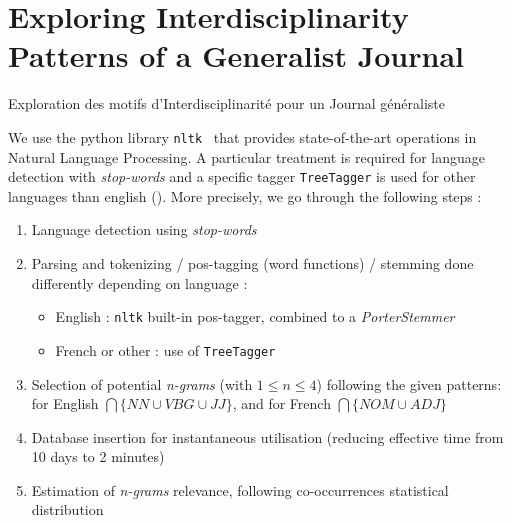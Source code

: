 


\newpage

\section[Exploring Interdisciplinarity][Exploration de l'Interdisciplinarité]{Exploring Interdisciplinarity Patterns of a Generalist Journal}{Exploration des motifs d'Interdisciplinarité pour un Journal généraliste}

\label{app:sec:cybergeo}







We use the python library \texttt{nltk}~\cite{bird2006nltk} that provides state-of-the-art operations in Natural Language Processing. A particular treatment is required for language detection with \emph{stop-words} and a specific tagger \texttt{TreeTagger} is used for other languages than english (\cite{schmid1994probabilistic}). More precisely, we go through the following steps :


\begin{enumerate}
\item Language detection using \textit{stop-words}
\item Parsing and tokenizing / pos-tagging (word functions) / stemming done differently depending on language :
\begin{itemize}
\item English : \texttt{nltk} built-in pos-tagger, combined to a \emph{PorterStemmer}
\item French or other : use of \texttt{TreeTagger}~\cite{schmid1994probabilistic}
\end{itemize}
\item Selection of potential \textit{n-grams} (with $1 \leq n \leq 4$) following the given patterns: for English $\bigcap \{NN \cup VBG \cup JJ \}$, and for French $\bigcap \{NOM \cup ADJ\}$
\item Database insertion for instantaneous utilisation (reducing effective time from 10 days to 2 minutes)
\item Estimation of \textit{n-grams} relevance, following co-occurrences statistical distribution
\end{enumerate}





